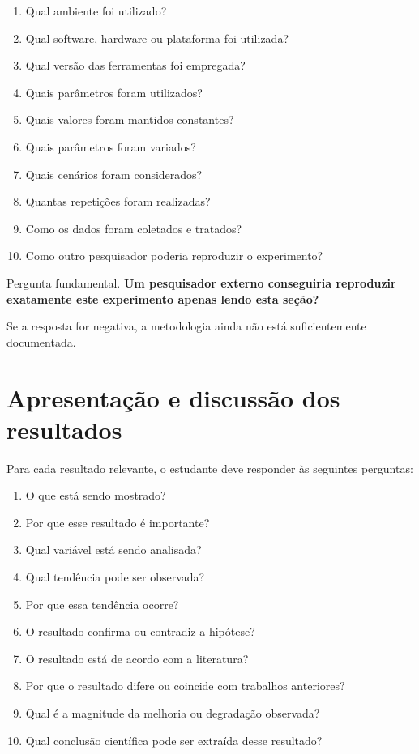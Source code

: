 \begin{enumerate}
	\item Qual ambiente foi utilizado?
	\item Qual software, hardware ou plataforma foi utilizada?
	\item Qual versão das ferramentas foi empregada?
	\item Quais parâmetros foram utilizados?
	\item Quais valores foram mantidos constantes?
	\item Quais parâmetros foram variados?
	\item Quais cenários foram considerados?
	\item Quantas repetições foram realizadas?
	\item Como os dados foram coletados e tratados?
	\item Como outro pesquisador poderia reproduzir o experimento?
\end{enumerate}

{Pergunta fundamental.}
\textbf{Um pesquisador externo conseguiria reproduzir exatamente este
	experimento apenas lendo esta seção?}

Se a resposta for negativa, a metodologia ainda não está suficientemente
documentada.

\section{Apresentação e discussão dos resultados}

Para cada resultado relevante, o estudante deve responder às seguintes
perguntas:

\begin{enumerate}
	\item O que está sendo mostrado?
	\item Por que esse resultado é importante?
	\item Qual variável está sendo analisada?
	\item Qual tendência pode ser observada?
	\item Por que essa tendência ocorre?
	\item O resultado confirma ou contradiz a hipótese?
	\item O resultado está de acordo com a literatura?
	\item Por que o resultado difere ou coincide com trabalhos anteriores?
	\item Qual é a magnitude da melhoria ou degradação observada?
	\item Qual conclusão científica pode ser extraída desse resultado?
\end{enumerate}

